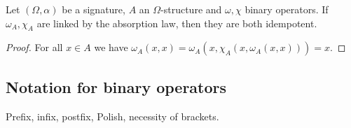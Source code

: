 \begin{lemma} \label{absorptionIdempotency}
Let $(\Omega, \alpha)$ be a signature, $A$ an $\Omega$-structure and $\omega, \chi$ binary operators. If $\omega_A, \chi_A$ are linked by the absorption law, then they are both idempotent.
\end{lemma}
\begin{proof}
For all $x\in A$ we have $\omega_A(x,x) = \omega_A(x,\chi_A(x,\omega_A(x,x))) = x$.
\end{proof}

\subsection{Notation for binary operators}
Prefix, infix, postfix, Polish, necessity of brackets.